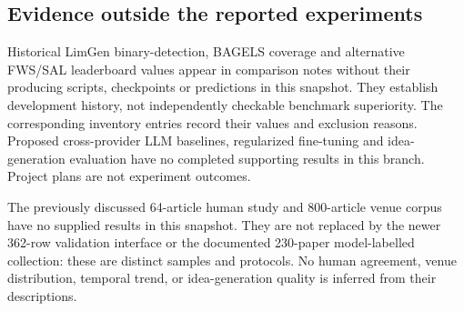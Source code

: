 \subsection{Evidence outside the reported experiments}
\label{A:excluded}

Historical LimGen binary-detection, BAGELS coverage and alternative FWS/SAL leaderboard values
appear in comparison notes without their producing scripts, checkpoints or predictions in this
snapshot. They establish development history, not independently checkable benchmark superiority.
The corresponding inventory entries record their values and exclusion reasons. Proposed
cross-provider LLM baselines, regularized fine-tuning and idea-generation evaluation have no
completed supporting results in this branch. Project plans are not experiment outcomes.

The previously discussed 64-article human study and 800-article venue corpus have no supplied
results in this snapshot. They are not replaced by the newer 362-row validation interface or
the documented 230-paper model-labelled collection: these are distinct samples and protocols.
No human agreement, venue distribution, temporal trend, or idea-generation quality is inferred
from their descriptions.
